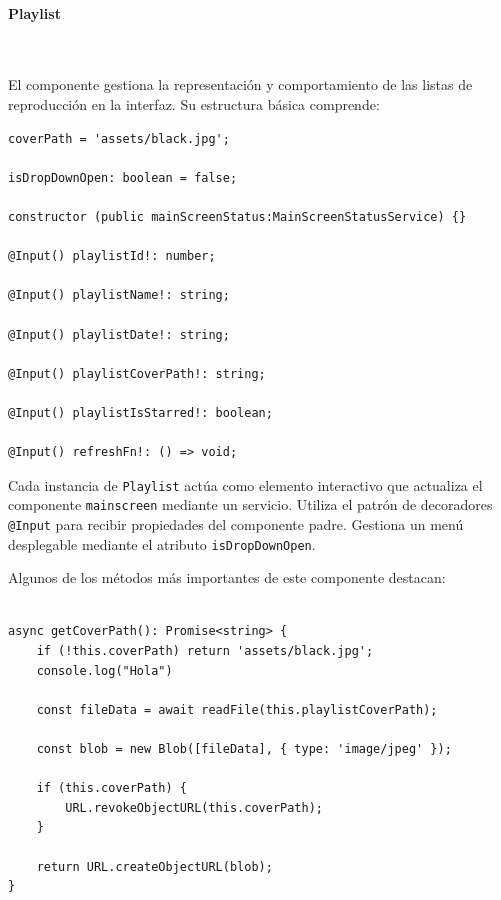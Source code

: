 \documentclass[11pt, a4paper]{article}
\begin{document}
                \paragraph{Playlist}
                ‎ 

                El componente gestiona la representación y comportamiento de las listas de reproducción en la interfaz. Su estructura básica comprende:

                \begin{lstlisting}[caption={Atributos y Constructora Playlist}]
coverPath = 'assets/black.jpg';

isDropDownOpen: boolean = false;

constructor (public mainScreenStatus:MainScreenStatusService) {}

@Input() playlistId!: number;

@Input() playlistName!: string;

@Input() playlistDate!: string;

@Input() playlistCoverPath!: string;

@Input() playlistIsStarred!: boolean;

@Input() refreshFn!: () => void;
                \end{lstlisting}

                Cada instancia de \verb|Playlist| actúa como elemento interactivo que actualiza el componente \verb|mainscreen| mediante un servicio. Utiliza el patrón de decoradores \verb|@Input| para recibir propiedades del componente padre. Gestiona un menú desplegable mediante el atributo \verb|isDropDownOpen|.
                
                Algunos de los métodos más importantes de este componente destacan:

                \begin{lstlisting}[caption={getCoverPath()}]

async getCoverPath(): Promise<string> {
    if (!this.coverPath) return 'assets/black.jpg';
    console.log("Hola")

    const fileData = await readFile(this.playlistCoverPath);
        
    const blob = new Blob([fileData], { type: 'image/jpeg' });

    if (this.coverPath) {
        URL.revokeObjectURL(this.coverPath);
    }

    return URL.createObjectURL(blob);
}
                \end{lstlisting}
\end{document}
